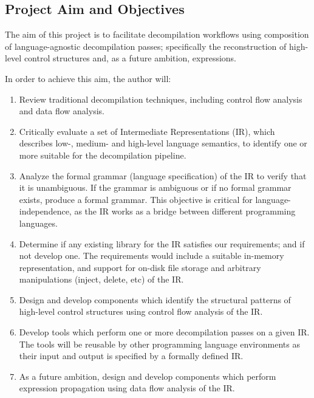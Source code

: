 \documentclass[12pt, a4paper]{article}
\begin{document}



\subsection{Project Aim and Objectives}

The aim of this project is to facilitate decompilation workflows using composition of language-agnostic decompilation passes; specifically the reconstruction of high-level control structures and, as a future ambition, expressions.

In order to achieve this aim, the author will:
\begin{enumerate}
	\item Review traditional decompilation techniques, including control flow analysis and data flow analysis.
	\item Critically evaluate a set of Intermediate Representations (IR), which describes low-, medium- and high-level language semantics, to identify one or more suitable for the decompilation pipeline.
	\item Analyze the formal grammar (language specification) of the IR to verify that it is unambiguous. If the grammar is ambiguous or if no formal grammar exists, produce a formal grammar. This objective is critical for language-independence, as the IR works as a bridge between different programming languages.
	\item Determine if any existing library for the IR satisfies our requirements; and if not develop one. The requirements would include a suitable in-memory representation, and support for on-disk file storage and arbitrary manipulations (inject, delete, etc) of the IR.
	\item Design and develop components which identify the structural patterns of high-level control structures using control flow analysis of the IR.
	\item Develop tools which perform one or more decompilation passes on a given IR. The tools will be reusable by other programming language environments as their input and output is specified by a formally defined IR.
	\item As a future ambition, design and develop components which perform expression propagation using data flow analysis of the IR.
\end{enumerate}
\end{document}
